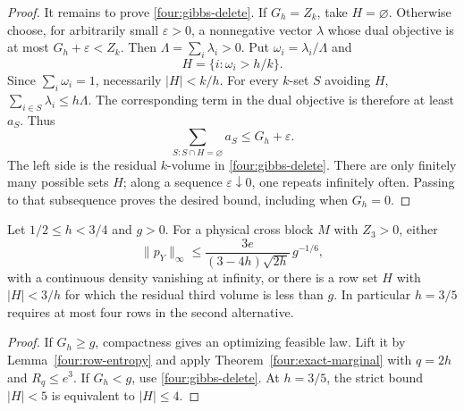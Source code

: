 \begin{proof}
It remains to prove \eqref{four:gibbs-delete}.
If \(G_h=Z_k\), take \(H=\varnothing\).
Otherwise choose, for arbitrarily small \(\varepsilon>0\),
a nonnegative vector \(\lambda\) whose dual objective is
at most \(G_h+\varepsilon<Z_k\).
Then \(\Lambda=\sum_i\lambda_i>0\).
Put \(\omega_i=\lambda_i/\Lambda\) and
\[
 H=\{i:\omega_i>h/k\}.
\]
Since \(\sum_i\omega_i=1\), necessarily \(|H|<k/h\).
For every \(k\)-set \(S\) avoiding \(H\),
\(\sum_{i\in S}\lambda_i\leq h\Lambda\).
The corresponding term in the dual objective is therefore
at least \(a_S\).  Thus
\[
 \sum_{S:S\cap H=\varnothing}a_S\leq G_h+\varepsilon.
\]
The left side is the residual \(k\)-volume in
\eqref{four:gibbs-delete}.  There are only finitely many
possible sets \(H\); along a sequence
\(\varepsilon\downarrow0\), one repeats infinitely often.
Passing to that subsequence proves the desired bound,
including when \(G_h=0\).
\end{proof}

\begin{corollary}
\label{four:gibbs-alternative}
Let \(1/2\leq h<3/4\) and \(g>0\).
For a physical cross block \(M\) with \(Z_3>0\), either
\[
 \|p_Y\|_\infty
 \leq\frac{3e}{(3-4h)\sqrt{2h}}\,g^{-1/6},
\]
with a continuous density vanishing at infinity, or there is
a row set \(H\) with \(|H|<3/h\) for which the residual
third volume is less than \(g\).
In particular \(h=3/5\) requires at most four rows in the
second alternative.
\end{corollary}
\begin{proof}
If \(G_h\geq g\), compactness gives an optimizing feasible law.
Lift it by Lemma~\ref{four:row-entropy} and apply
Theorem~\ref{four:exact-marginal} with \(q=2h\) and
\(R_q\leq e^3\).  If \(G_h<g\), use
\eqref{four:gibbs-delete}.  At \(h=3/5\), the strict bound
\(|H|<5\) is equivalent to \(|H|\leq4\).
\end{proof}

